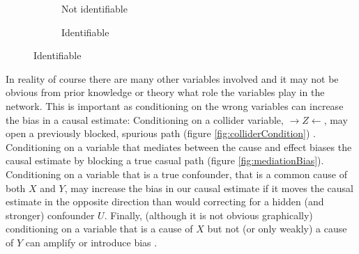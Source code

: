 \documentclass[11pt,a4paper]{article}
\begin{document}
\begin{figure}[h]
\centering
\caption{Chocolate and Obesity}
\label{fig:chocolate}
\begin{subfigure}[t]{0.4\textwidth}
\caption{Not identifiable}
\label{fig:chockNI}
\end{subfigure}
\begin{subfigure}[t]{0.4\textwidth}
\caption{Identifiable}
\label{fig:chockI}
\end{subfigure}
\end{figure}

In reality of course there are many other variables involved  \cite{Golomb2012} and it may not be obvious from prior knowledge or theory what role the variables play in the network. This is important as conditioning on the wrong variables can increase the bias in a causal estimate: Conditioning on a collider variable, $\rightarrow Z \leftarrow$, may open a previously blocked, spurious path \cite{Sjolander2009a} (figure \ref{fig:colliderCondition}) . Conditioning on a variable that mediates between the cause and effect biases the causal estimate by blocking a true casual path (figure \ref{fig:mediationBias}). Conditioning on a variable that is a true confounder, that is a common cause of both $X$ and $Y$, may increase the bias in our causal estimate if it moves the causal estimate in the opposite direction than would correcting for a hidden (and stronger) confounder $U$. Finally, (although it is not obvious graphically) conditioning on a variable that is a cause of $X$ but not (or only weakly) a cause of $Y$ can amplify or introduce bias \cite{Pearl2012b,Wooldridge2009}.
\end{document}
